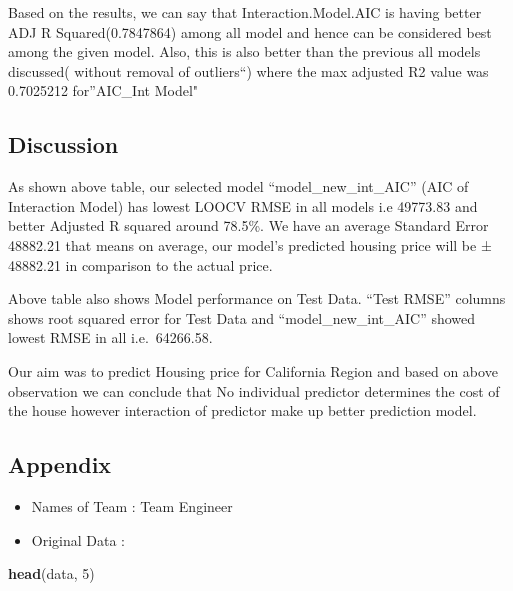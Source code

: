 \documentclass[
]{article}
\newenvironment{Shaded}{\begin{snugshade}}{\end{snugshade}}
\newcommand{\DecValTok}[1]{\textcolor[rgb]{0.00,0.00,0.81}{#1}}
\newcommand{\KeywordTok}[1]{\textcolor[rgb]{0.13,0.29,0.53}{\textbf{#1}}}
\newcommand{\NormalTok}[1]{#1}
\providecommand{\tightlist}{%
  \setlength{\itemsep}{0pt}\setlength{\parskip}{0pt}}
\begin{document}
Based on the results, we can say that Interaction.Model.AIC is having
better ADJ R Squared(0.7847864) among all model and hence can be
considered best among the given model. Also, this is also better than
the previous all models discussed( without removal of outliers``) where
the max adjusted R2 value was 0.7025212 for''AIC\_Int Model"

\hypertarget{discussion}{%
\subsection{Discussion}\label{discussion}}

As shown above table, our selected model ``model\_new\_int\_AIC'' (AIC
of Interaction Model) has lowest LOOCV RMSE in all models i.e 49773.83
and better Adjusted R squared around 78.5\%. We have an average Standard
Error 48882.21 that means on average, our model's predicted housing
price will be ± 48882.21 in comparison to the actual price.

Above table also shows Model performance on Test Data. ``Test RMSE''
columns shows root squared error for Test Data and
``model\_new\_int\_AIC'' showed lowest RMSE in all i.e.~64266.58.

Our aim was to predict Housing price for California Region and based on
above observation we can conclude that No individual predictor
determines the cost of the house however interaction of predictor make
up better prediction model.

\hypertarget{appendix}{%
\subsection{Appendix}\label{appendix}}

\begin{itemize}
\tightlist
\item
  Names of Team : Team Engineer
\item
  Original Data :
\end{itemize}

\begin{Shaded}
\begin{Highlighting}[]
\KeywordTok{head}\NormalTok{(data, }\DecValTok{5}\NormalTok{)}
\end{Highlighting}
\end{Shaded}
\end{document}
